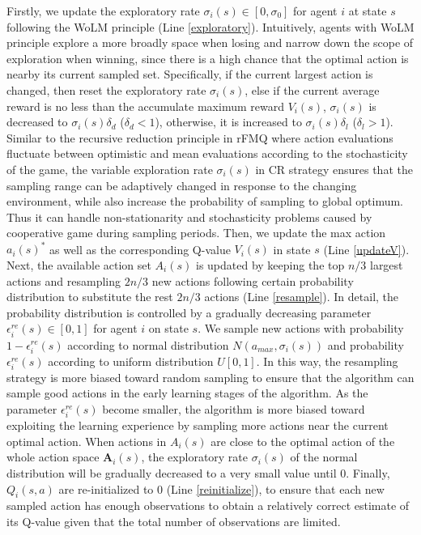 \documentclass[journal,transmag]{IEEEtran}
\begin{document}
Firstly, we update the exploratory rate $\sigma_{i}(s)\in [0,\sigma_0]$ for agent $i$ at state $s$ following the WoLM principle (Line \ref{exploratory}). Intuitively, agents with WoLM principle explore a more broadly space when losing and narrow down the scope of exploration when winning, since there is a high chance that the optimal action is nearby its current sampled set. Specifically, if the current largest action is changed, then reset the exploratory rate $\sigma_{i}(s)$, else if the current average reward is no less than the accumulate maximum reward $V_i(s)$, $\sigma_{i}(s)$ is decreased to $\sigma_{i}(s)\delta_d$ ($\delta_d<1$), otherwise, it is increased to $\sigma_{i}(s)\delta_l$ ($\delta_l>1$). Similar to the recursive reduction principle in rFMQ where action evaluations fluctuate between optimistic and mean evaluations according to the stochasticity of the game, the variable exploration rate $\sigma_{i}(s)$ in CR strategy ensures that the sampling range can be adaptively changed in response to the changing environment, while also increase the probability of sampling to global optimum. Thus it can handle non-stationarity and stochasticity problems caused by cooperative game during sampling periods. Then, we update the max action $a_{i}(s)^{*}$ as well as the corresponding Q-value $V_i(s)$ in state $s$ (Line \ref{updateV}). Next, the available action set $A_i(s)$ is updated by keeping the top $n/3$ largest actions and resampling $2n/3$ new actions following certain probability distribution to substitute the rest $2n/3$ actions (Line \ref{resample}). In detail, the probability distribution is controlled by a gradually decreasing parameter $\epsilon_{i}^{re}(s) \in [0,1]$ for agent $i$ on state $s$. We sample new actions with probability $1-\epsilon_{i}^{re}(s)$ according to normal distribution $N(a_{max},\sigma_i(s))$ and probability $\epsilon_{i}^{re}(s)$ according to uniform distribution $U[0,1]$. In this way, the resampling strategy is more biased toward random sampling to ensure that the algorithm can sample good actions in the early learning stages of the algorithm. As the parameter $\epsilon_{i}^{re}(s)$ become smaller, the algorithm is more biased toward exploiting the learning experience by sampling more actions near the current optimal action. When actions in $A_i(s)$ are close to the optimal action of the whole action space $\mathbf{A}_i(s)$, the exploratory rate $\sigma_{i}(s)$ of the normal distribution will be gradually decreased to a very small value until 0. Finally, $Q_{i}(s,a)$ are re-initialized to $0$ (Line \ref{reinitialize}), to ensure that each new sampled action has enough observations to obtain a relatively correct estimate of its Q-value given that the total number of observations are limited. %
\end{document}
